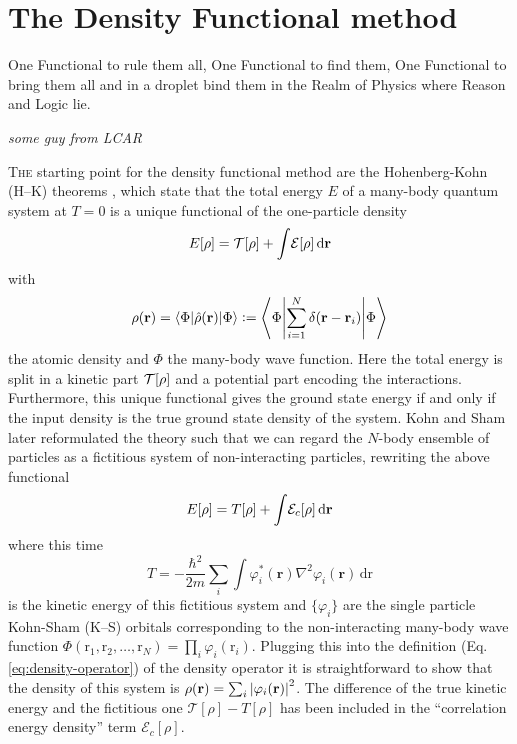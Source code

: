 \documentclass[12pt,a4paper]{book}
\renewcommand{\vec}[1]{\bm{\mathrm{#1}}}
\newcommand{\diff}[1]{\,\mathrm{d}{\vec{#1}}}
\begin{document}
	\chapter{The Density Functional method}\label{sec:dft-method}
		\epigraph{One Functional to rule them all,
		One Functional to find them,
		One Functional to bring them all
		and in a droplet bind them
		in the Realm of Physics where Reason and Logic lie.}{\textit{some guy from LCAR}}
		\lettrine[lines=3,findent=3pt,nindent=0pt]{T}{he} starting point for the density functional method are the Hohenberg-Kohn (H--K) theorems \cite{Hoh64}, which state that the total energy $E$ of a many-body quantum system at $T=0$ is a unique functional of the one-particle density
		\begin{align}
			E[\rho] = {\cal T}[\rho] +\int\!{\cal E}[\rho]\diff{r} \label{eq1}
		\end{align}
		with
		\begin{align}\label{eq:density-operator}
			\rho({\mathbf r})= \ev**{\hat\rho(\vec{r})}{\Phi} \vcentcolon= \ev**{\sum _{i=1}^{N}\delta({\mathbf r}-{\mathbf r}_i)}{\Phi}
		\end{align}
		the atomic density and $\Phi$ the many-body wave function. Here the total energy is split in a kinetic part ${\cal T}[\rho]$ and a potential part encoding the interactions. Furthermore, this unique functional gives the ground state energy if and only if the input density is the true ground state density of the system. Kohn and Sham later reformulated the theory such that we can regard the $N$-body ensemble of particles as a fictitious system of non-interacting particles, rewriting the above functional 
		\begin{equation}
			E[\rho] = T[\rho] + \int\!{\cal E}_c[\rho]\diff{r} \label{eq:ks-tot-energy}
		\end{equation}
		where this time
		\begin{equation}
			T= -\frac{\hbar^2}{2m} \sum_i \int\! \varphi _i^\ast ({\mathbf r})\nabla^2  \varphi _i ({\mathbf r})\diff{r} \label{eq:kin-energy}
		\end{equation}
		is the kinetic energy of this fictitious system and $\{\varphi_i\}$ are the single particle Kohn-Sham (K--S) orbitals corresponding to the non-interacting many-body wave function $\Phi(\vec{r}_1,\vec{r}_2,\ldots,\vec{r}_N)=\prod_i\varphi_i(\vec{r}_i)$. Plugging this into the definition (Eq. \ref{eq:density-operator}) of the density operator it is straightforward to show that the density of this system is $\rho(\vec{r})=\sum_i\absolutevalue{\varphi_i(\vec{r})}^2$. The difference of the true kinetic energy and the fictitious one $\mathcal{T}[\rho]-T[\rho]$ has been included in the ``correlation energy density'' term $\mathcal{E}_c[\rho]$.\\
		
\end{document}
